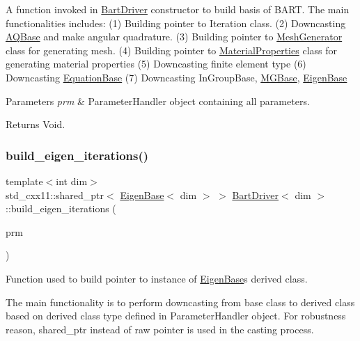 A function invoked in \hyperlink{class_bart_driver}{Bart\+Driver} constructor to build basis of B\+A\+RT. The main functionalities includes\+: (1) Building pointer to Iteration class. (2) Downcasting \hyperlink{class_a_q_base}{A\+Q\+Base} and make angular quadrature. (3) Building pointer to \hyperlink{class_mesh_generator}{Mesh\+Generator} class for generating mesh. (4) Building pointer to \hyperlink{class_material_properties}{Material\+Properties} class for generating material properties (5) Downcasting finite element type (6) Downcasting \hyperlink{class_equation_base}{Equation\+Base} (7) Downcasting In\+Group\+Base, \hyperlink{class_m_g_base}{M\+G\+Base}, \hyperlink{class_eigen_base}{Eigen\+Base}


\begin{DoxyParams}{Parameters}
{\em prm} & Parameter\+Handler object containing all parameters. \\
\hline
\end{DoxyParams}
\begin{DoxyReturn}{Returns}
Void. 
\end{DoxyReturn}
\mbox{\label{class_bart_driver_abc542028ef1ab71693acba10bf017018}} 
\subsubsection{\texorpdfstring{build\+\_\+eigen\+\_\+iterations()}{build\_eigen\_iterations()}}
{\footnotesize\ttfamily template$<$int dim$>$ \\
std\+\_\+cxx11\+::shared\+\_\+ptr$<$ \hyperlink{class_eigen_base}{Eigen\+Base}$<$ dim $>$ $>$ \hyperlink{class_bart_driver}{Bart\+Driver}$<$ dim $>$\+::build\+\_\+eigen\+\_\+iterations (\begin{DoxyParamCaption}\item[{const Parameter\+Handler \&}]{prm }\end{DoxyParamCaption})\hspace{0.3cm}{\ttfamily [private]}}



Function used to build pointer to instance of \hyperlink{class_eigen_base}{Eigen\+Base}\textquotesingle{}s derived class. 

The main functionality is to perform downcasting from base class to derived class based on derived class type defined in Parameter\+Handler object. For robustness reason, shared\+\_\+ptr instead of raw pointer is used in the casting process.


